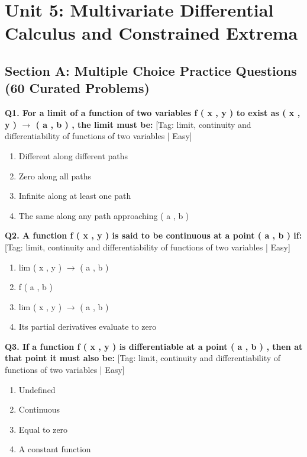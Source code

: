 \chapter{Unit 5: Multivariate Differential Calculus and Constrained Extrema}

\section{Section A: Multiple Choice Practice Questions (60 Curated Problems)}

\noindent\textbf{Q1. For a limit of a function of two variables f ( x , y ) to exist as ( x , y ) $\to$ ( a , b ) , the limit must be:} \hfill [Tag: limit, continuity and differentiability of functions of two variables | Easy]
\begin{enumerate}[label=(\alph*),topsep=2pt,itemsep=1pt,partopsep=0pt,parsep=0pt]
    \item {{Different along different paths}}
    \item {{Zero along all paths}}
    \item {{Infinite along at least one path}}
    \item {{The same along any path approaching ( a , b )}}
\end{enumerate}
\vspace{2mm}

\noindent\textbf{Q2. A function f ( x , y ) is said to be continuous at a point ( a , b ) if:} \hfill [Tag: limit, continuity and differentiability of functions of two variables | Easy]
\begin{enumerate}[label=(\alph*),topsep=2pt,itemsep=1pt,partopsep=0pt,parsep=0pt]
    \item {{lim ( x , y ) $\to$ ( a , b )}}
    \item {{f ( a , b )}}
    \item {{lim ( x , y ) $\to$ ( a , b )}}
    \item {{Its partial derivatives evaluate to zero}}
\end{enumerate}
\vspace{2mm}

\noindent\textbf{Q3. If a function f ( x , y ) is differentiable at a point ( a , b ) , then at that point it must also be:} \hfill [Tag: limit, continuity and differentiability of functions of two variables | Easy]
\begin{enumerate}[label=(\alph*),topsep=2pt,itemsep=1pt,partopsep=0pt,parsep=0pt]
    \item {{Undefined}}
    \item {{Continuous}}
    \item {{Equal to zero}}
    \item {{A constant function}}
\end{enumerate}
\vspace{2mm}

